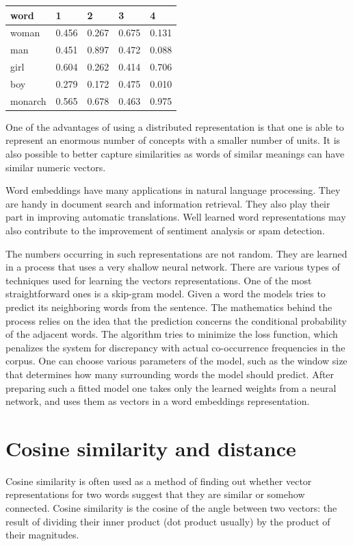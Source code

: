 \documentclass[12pt,]{book}
\begin{document}
\begin{longtable}[]{@{}lllll@{}}
\toprule
word & 1 & 2 & 3 & 4\tabularnewline
\midrule
\endhead
woman & 0.456 & 0.267 & 0.675 & 0.131\tabularnewline
man & 0.451 & 0.897 & 0.472 & 0.088\tabularnewline
girl & 0.604 & 0.262 & 0.414 & 0.706\tabularnewline
boy & 0.279 & 0.172 & 0.475 & 0.010\tabularnewline
monarch & 0.565 & 0.678 & 0.463 & 0.975\tabularnewline
\bottomrule
\end{longtable}

One of the advantages of using a distributed representation is that one
is able to represent an enormous number of concepts with a smaller
number of units. It is also possible to better capture similarities as
words of similar meanings can have similar numeric vectors.

Word embeddings have many applications in natural language processing.
They are handy in document search and information retrieval. They also
play their part in improving automatic translations. Well learned word
representations may also contribute to the improvement of sentiment
analysis or spam detection.

The numbers occurring in such representations are not random. They are
learned in a process that uses a very shallow neural network. There are
various types of techniques used for learning the vectors
representations. One of the most straightforward ones is a skip-gram
model. Given a word the models tries to predict its neighboring words
from the sentence. The mathematics behind the process relies on the idea
that the prediction concerns the conditional probability of the adjacent
words. The algorithm tries to minimize the loss function, which
penalizes the system for discrepancy with actual co-occurrence
frequencies in the corpus. One can choose various parameters of the
model, such as the window size that determines how many surrounding
words the model should predict. After preparing such a fitted model one
takes only the learned weights from a neural network, and uses them as
vectors in a word embeddings representation.

\section{Cosine similarity and
distance}\label{cosine-similarity-and-distance}

Cosine similarity is often used as a method of finding out whether
vector representations for two words suggest that they are similar or
somehow connected. Cosine similarity is the cosine of the angle between
two vectors: the result of dividing their inner product (dot product
usually) by the product of their magnitudes.
\end{document}

